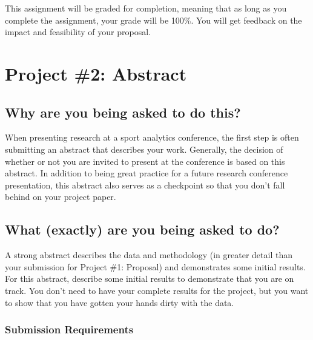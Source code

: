 \documentclass{article}
\begin{document}
      This assignment will be graded for completion, meaning that as long as you complete the assignment, your grade will be 100\%. You will get feedback on the impact and feasibility of your proposal.\\

  \newpage
  \section*{\sc Project \#2: Abstract}

    \subsection*{\sc Why are you being asked to do this?}

      When presenting research at a sport analytics conference, the first step is often submitting an abstract that describes your work. Generally, the decision of whether or not you are invited to present at the conference is based on this abstract. In addition to being great practice for a future research conference presentation, this abstract also serves as a checkpoint so that you don't fall behind on your project paper.

    \subsection*{\sc What (exactly) are you being asked to do?}

      A strong abstract describes the data and methodology (in greater detail than your submission for Project \#1: Proposal) and demonstrates some initial results. For this abstract, describe some initial results to demonstrate that you are on track. You don't need to have your complete results for the project, but you want to show that you have gotten your hands dirty with the data.

      \subsubsection*{\sc Submission Requirements}
\end{document}

